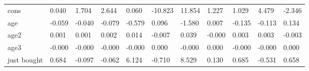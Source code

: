 \begin{table}[htbp]
\begin{tabular}{lllllllllll}
cons &     0.040 &     1.704 &     2.644 &     0.060 &   -10.823 &    11.854 &     1.227 &     1.029 &     4.479 &    -2.346 \\  
age &    -0.059 &    -0.040 &    -0.079 &    -0.579 &     0.096 &    -1.580 &     0.007 &    -0.135 &    -0.113 &     0.134 \\  
age2 &     0.001 &     0.001 &     0.002 &     0.014 &    -0.007 &     0.039 &    -0.000 &     0.003 &     0.003 &    -0.003 \\  
age3 &    -0.000 &    -0.000 &    -0.000 &    -0.000 &     0.000 &    -0.000 &     0.000 &    -0.000 &    -0.000 &     0.000 \\  
just bought &     0.684 &    -0.097 &    -0.062 &     6.124 &    -0.710 &     8.529 &     0.130 &     0.685 &    -0.531 &     0.658 \\  
\hline \hline \end{tabular}
\end{table}
